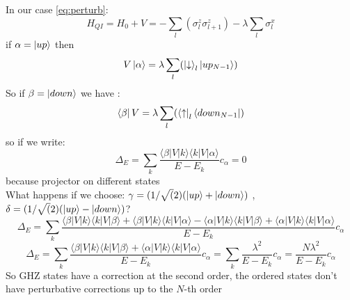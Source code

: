 \documentclass[12pt,a4paper]{article}
\begin{document}
In our case \ref{eq:perturb}:
\begin{equation}
	H_{QI}=H_0+V=-\sum_{l}\left(\sigma_{l}^{z} \sigma_{l+1}^{z}\right) - \lambda \sum_l  \sigma_{l}^{x}
\end{equation}
if $\alpha=\ket{up}$ then 
\begin{equation}
	V\ket{\alpha}=\lambda\sum_{ l }( \ket{\downarrow}_l\ket{up_{N-1}})
\end{equation}
So if $\beta=\ket{down}$ we have :
\begin{equation}
	\bra{\beta}V=\lambda\sum_{ l }( \bra{\uparrow}_l\bra{down_{N-1}})
\end{equation}
so if we write:
\begin{equation}
\Delta_E=\sum_{k} \frac{\langle\beta|V| k\rangle\langle k|V| \alpha\rangle}{E-E_{k}} c_{\alpha}=0
\end{equation}
because projector on different states\\
What happens if we choose:
$\gamma=(1/\sqrt(2)(\ket{up}+\ket{down})$ ,$\delta=(1/\sqrt(2)(\ket{up}-\ket{down})$?
\begin{equation}
	\Delta_E=\sum_{k} \frac{\langle\beta|V| k\rangle \langle k |V| \beta \rangle+\langle\beta|V| k\rangle\langle k|V| \alpha \rangle-\langle\alpha|V| k\rangle\langle k|V| \beta\rangle+\langle\alpha|V| k\rangle\langle k|V| \alpha\rangle}{E-E_{k}} c_{\alpha}
\end{equation}
\begin{equation}
	\Delta_E=\sum_{k} \frac{\langle\beta|V| k\rangle \langle k |V| \beta \rangle+\langle \alpha |V| k\rangle\langle k|V| \alpha\rangle}{E-E_{k}} c_{\alpha}=\sum_{k} \frac{\lambda^2}{E-E_{k}} c_{\alpha}= \frac{N\lambda^2}{E-E_{k}} c_{\alpha}
\end{equation}
So GHZ states have a correction at the second order, the ordered states don't have perturbative corrections up to the $N$-th order


\end{document}
